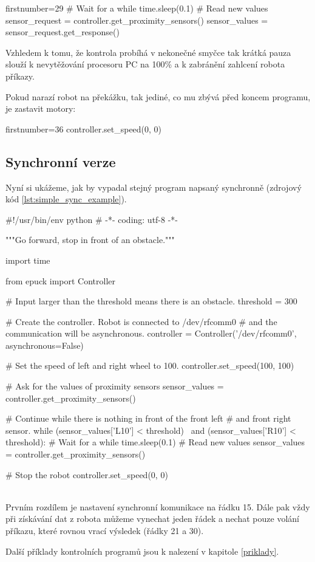     \begin{pyc*}{firstnumber=29}
    # Wait for a while
    time.sleep(0.1)
    # Read new values
    sensor_request = controller.get_proximity_sensors()
    sensor_values = sensor_request.get_response()
    \end{pyc*}

    Vzhledem k tomu, že kontrola probíhá v nekonečné smyčce tak krátká pauza
    slouží k nevytěžování procesoru PC na 100\% a k zabránění zahlcení robota
    příkazy.

    Pokud narazí robot na překážku, tak jediné, co mu zbývá před koncem
    programu, je zastavit motory:

    \begin{pyc*}{firstnumber=36}
    controller.set_speed(0, 0)
    \end{pyc*}

    \subsection{Synchronní verze}

    Nyní si ukážeme, jak by vypadal stejný program napsaný synchronně (zdrojový
    kód \ref{lst:simple_sync_example}).

    \begin{mylisting}
    \begin{pyc}
#!/usr/bin/env python
# -*- coding: utf-8 -*-

"""Go forward, stop in front of an obstacle."""

import time

from epuck import Controller

# Input larger than the threshold means there is an obstacle.
threshold = 300

# Create the controller. Robot is connected to /dev/rfcomm0
# and the communication will be asynchronous.
controller = Controller('/dev/rfcomm0', asynchronous=False)

# Set the speed of left and right wheel to 100.
controller.set_speed(100, 100)

# Ask for the values of proximity sensors
sensor_values = controller.get_proximity_sensors()

# Continue while there is nothing in front of the front left
# and front right sensor.
while (sensor_values['L10'] < threshold) \
    and (sensor_values['R10'] < threshold):
    # Wait for a while
    time.sleep(0.1)
    # Read new values
    sensor_values = controller.get_proximity_sensors()

# Stop the robot
controller.set_speed(0, 0)
\end{pyc}
\label{lst:simple_sync_example}
\end{mylisting}
\hfill\\

Prvním rozdílem je nastavení synchronní komunikace na řádku 15. Dále pak vždy
při získávání dat z robota můžeme vynechat jeden řádek a nechat pouze volání
příkazu, které rovnou vrací výsledek (řádky 21 a 30).

Další příklady kontrolních programů jsou k nalezení v kapitole \ref{priklady}.
